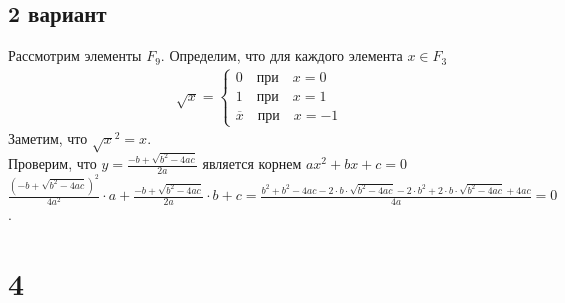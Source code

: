 	
	\subsection{2 вариант}
		Рассмотрим элементы $F_9$. Определим, что для каждого элемента $x \in F_3$\\
		\begin{gather*}
		\sqrt{x} =
			\begin{cases}
				0 \quad \text{при} \quad x = 0 \\
				1 \quad \text{при} \quad x = 1 \\
				\overline{x} \quad \text{при} \quad x = -1
			\end{cases}
		\end{gather*}
		Заметим, что $\sqrt{x}^2 = x$.\\
		Проверим, что $y = \frac{-b + \sqrt{b^2 - 4ac} }{2a}$ является корнем $ax^2 + bx + c = 0$\\
		$\frac{(-b + \sqrt{b^2 - 4ac})^2}{4a^2} \cdot a + \frac{-b + \sqrt{b^2 - 4ac}}{2a} \cdot b + c = \frac{b^2 + b^2 - 4ac - 2\cdot b\cdot\sqrt{b^2 - 4ac} - 2\cdot b^2 + 2\cdot b\cdot\sqrt{b^2 - 4ac} + 4ac}{4a} = 0$.
		
\newpage
\section{4}
